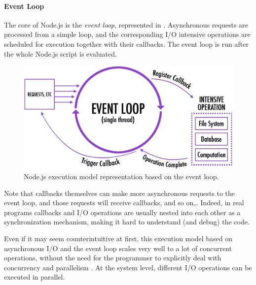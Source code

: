 \paragraph{Event Loop}
The core of Node.js is the \emph{event loop}, represented in .
Asynchronous requests are processed from a simple loop, and the corresponding I/O intensive operations are scheduled for execution together with their callbacks.
The event loop is run after the whole Node.js script is evaluated.

\begin{figure}[h]
	\centering
	\includegraphics[width=.7\textwidth]{fig/event-loop}
	\caption{Node.js execution model representation based on the event loop.}
	\label{fig:eventloop}
\end{figure}

Note that callbacks themselves can make more asynchronous requests to the event loop, and those requests will receive callbacks, and so on\dots{}
Indeed, in real programs callbacks and I/O operations are usually nested into each other as a synchronization mechanism, making it hard to understand (and debug) the code.

Even if it may seem counterintuitive at first, this execution model based on asynchronous I/O and the event loop scales very well to a lot of concurrent operations, without the need for the programmer to explicitly deal with concurrency and parallelism \cite{Nodejs10,NodejsPerformance14}.
At the system level, different I/O operations can be executed in parallel.
